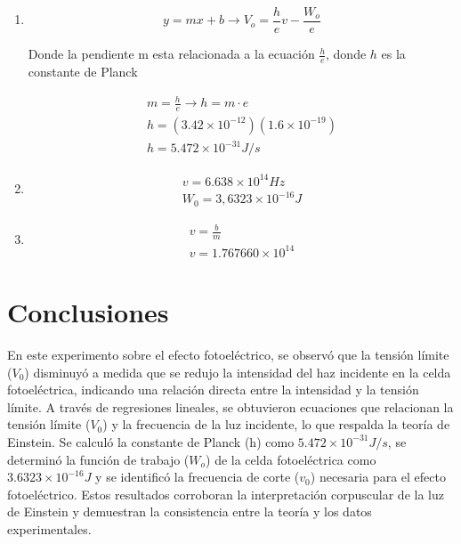 \documentclass[letterpaper, 12pt]{article}
\begin{document}
\begin{enumerate}
      \item \begin{equation*}
                  y = mx + b \rightarrow V_{o} = \frac{h}{e}v - \frac{W_{o}}{e}
            \end{equation*}

            Donde la pendiente m esta relacionada a la ecuación
            $\frac{h}{e}$, donde $h$ es la constante de Planck

            \begin{equation*}
                  \begin{gathered}
                        m = \frac{h}{e} \rightarrow h = m \cdot e \\
                        h = (3.42 \times 10^{-12}) (1.6 \times 10^{-19}) \\
                        h = 5.472 \times 10^{-31} J/s
                  \end{gathered}
            \end{equation*}

      \item \begin{equation*}
                  \begin{gathered}
                        v = 6.638 \times 10^{14} Hz \\
                        W_{0} = 3,6323 \times 10^{-16} J
                  \end{gathered}
            \end{equation*}

      \item \begin{equation*}
                  \begin{gathered}
                        v = \frac{b}{m} \\
                        v = 1.767660 \times 10^{14}
                  \end{gathered}
            \end{equation*}
\end{enumerate}

\section{Conclusiones}

En este experimento sobre el efecto fotoeléctrico, se
observó que la tensión límite ($V_0$) disminuyó a medida
que se redujo la intensidad del haz incidente en la celda
fotoeléctrica, indicando una relación directa entre la
intensidad y la tensión límite. A través de regresiones
lineales, se obtuvieron ecuaciones que relacionan la
tensión límite ($V_0$) y la frecuencia de la luz incidente,
lo que respalda la teoría de Einstein. Se calculó la
constante de Planck (h) como $5.472 \times 10^{-31} J/s$,
se determinó la función de trabajo ($W_o$) de la celda
fotoeléctrica como $3.6323 \times 10^{-16} J$ y se
identificó la frecuencia de corte ($v_0$) necesaria para el
efecto fotoeléctrico. Estos resultados corroboran la
interpretación corpuscular de la luz de Einstein y
demuestran la consistencia entre la teoría y los datos
experimentales.

\printbibliography
\end{document}
